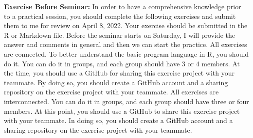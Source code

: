 \documentclass[11pt,a4paper]{letter}
\begin{document}
\textbf{Exercise Before Seminar:} In order to have a comprehensive knowledge prior to a practical session, you should complete the following exercises and submit them to me for review on April 8, 2022. Your exercise should be submitted in the R or Markdown file. Before the seminar starts on Saturday, I will provide the answer and comments in general and then we can start the practice. All exercises are connected. To better understand the basic program language in R, you should do it. You can do it in groups, and each group should have 3 or 4 members. At the time, you should use a GitHub for sharing this exercise project with your teammate. By doing so, you should create a GitHub account and a sharing repository on the exercise project with your teammate. All exercises are interconnected. You can do it in groups, and each group should have three or four members. At this point, you should use a GitHub to share this exercise project with your teammate. In doing so, you should create a GitHub account and a sharing repository on the exercise project with your teammate. 
\end{document}
